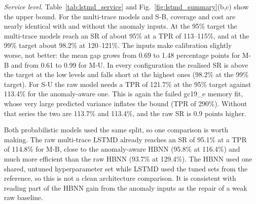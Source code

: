 \textit{Service level.}
Table~\ref{tab:lstmd_service} and Fig.~\ref{fig:lstmd_summary}(b,c) show the upper bound. For the multi-trace models and S-B, coverage and cost are nearly identical with and without the anomaly inputs. At the 95\% target the multi-trace models reach an SR of about 95\% at a TPR of 113--115\%, and at the 99\% target about 98.2\% at 120--121\%. The inputs make calibration slightly worse, not better: the mean gap grows from 0.69 to 1.48 percentage points for M-B and from 0.61 to 0.99 for M-U. In every configuration the realised SR is above the target at the low levels and falls short at the highest ones (98.2\% at the 99\% target). For S-U the raw model needs a TPR of 121.7\% at the 95\% target against 113.4\% for the anomaly-aware one. This is again the failed gc19\_e memory fit, whose very large predicted variance inflates the bound (TPR of 290\%). Without that series the two are 113.7\% and 113.4\%, and the raw SR is 0.9 points higher.

Both probabilistic models used the same split, so one comparison is worth making. The raw multi-trace LSTMD already reaches an SR of 95.1\% at a TPR of 114.8\% for M-B, close to the anomaly-aware HBNN (95.8\% at 116.4\%) and much more efficient than the raw HBNN (93.7\% at 129.4\%). The HBNN used one shared, untuned hyperparameter set while LSTMD used the tuned sets from the reference, so this is not a clean architecture comparison. It is consistent with reading part of the HBNN gain from the anomaly inputs as the repair of a weak raw baseline.

